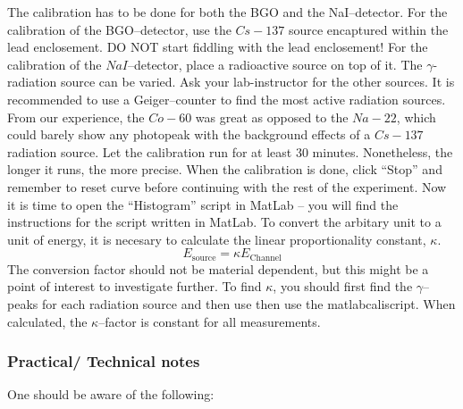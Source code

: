 \documentclass[a4paper, oneside, onecolumn, 11pt]{memoir}
\begin{document}
The calibration has to be done for both the BGO and the NaI–detector. For the
calibration of the BGO–detector, use the $Cs-137$ source encaptured within the
lead enclosement. DO NOT start fiddling with the lead enclosement! For the
calibration of the $NaI$–detector, place a radioactive source on top of it. The
$\gamma$-radiation source can be varied. Ask your lab-instructor for the other
sources. It is recommended to use a Geiger–counter to find the most active
radiation sources. From our experience, the $Co-60$ was great as opposed to the
$Na-22$, which could barely show any photopeak with the background effects of a
$Cs-137$ radiation source.  Let the calibration run for at least 30 minutes.
Nonetheless, the longer it runs, the more precise. When the calibration is
done, click “Stop” and remember to reset curve before continuing with the rest
of the experiment. Now it is time to open the “Histogram” script in MatLab –
you will find the instructions for the script written in MatLab. To convert the
arbitary unit to a unit of energy, it is necesary to calculate the linear
proportionality constant, $\kappa$.
\begin{equation}
    E_{\text{source}} = \kappa E_{\text{Channel}}
\label{eq:unitconversion}
\end{equation}
The conversion factor should not be material dependent, but this might be a
point of interest to investigate further. To find $\kappa$, you should first
find the $\gamma$–peaks for each radiation source and then use then use the
matlabcaliscript. When calculated, the $\kappa$–factor is constant for all
measurements.

\subsubsection{Practical/ Technical notes}
One should be aware of the following:
\end{document}
